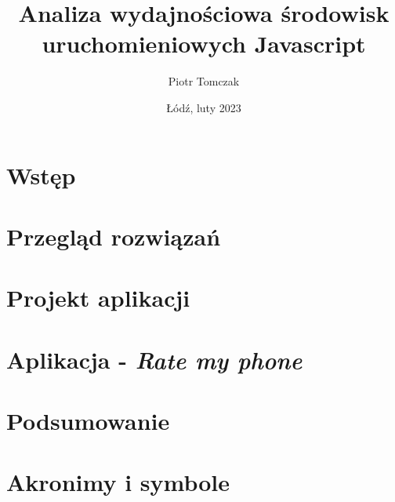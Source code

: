 \documentclass[a4paper,12pt,twoside]{extreport}
\title{Analiza wydajnościowa środowisk uruchomieniowych Javascript}
\author{Piotr Tomczak}
\date{\L{}\'od\'z, luty 2023}
\begin{document}


\thispagestyle{plain}



% 

\tableofcontents
{}

\chapter{Wstęp}


\chapter{Przegląd rozwiązań}


\chapter{Projekt aplikacji}


\chapter{Aplikacja - \textit{Rate my phone}}


\chapter{Podsumowanie}


\printbibliography[heading=bibintoc, title=Bibliografia]

\newpage
\listoffigures

\newpage
\listofcodes

\newpage
\listoftables

\appendix
\chapter{Akronimy i symbole}

\end{document}
